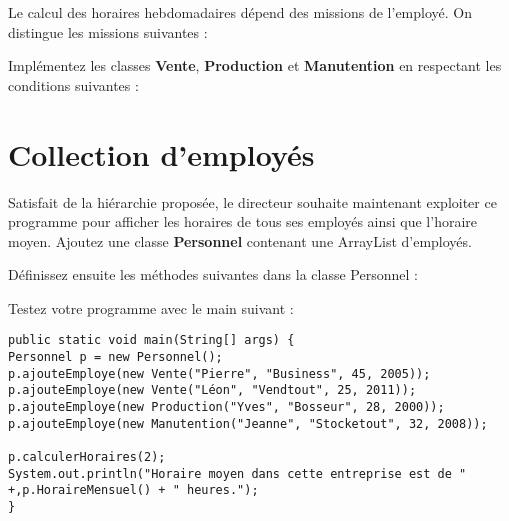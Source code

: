 \documentclass[a4paper]{article}
\begin{document}
Le calcul des horaires hebdomadaires dépend des missions de l’employé.
On distingue les missions suivantes :


Implémentez les classes \textbf{Vente},
	\textbf{Production} et \textbf{Manutention} en respectant les conditions suivantes :


\section{Collection d’employés}

Satisfait de la hiérarchie proposée,
	le directeur souhaite maintenant exploiter ce programme pour afficher les horaires de tous ses employés ainsi que l’horaire moyen.
Ajoutez une classe \textbf{Personnel} contenant une ArrayList d’employés.

\medskip
Définissez ensuite les méthodes suivantes dans la classe Personnel :

Testez votre programme avec le main suivant :

\begin{lstlisting}
public static void main(String[] args) {
Personnel p = new Personnel();
p.ajouteEmploye(new Vente("Pierre", "Business", 45, 2005));
p.ajouteEmploye(new Vente("Léon", "Vendtout", 25, 2011));
p.ajouteEmploye(new Production("Yves", "Bosseur", 28, 2000));
p.ajouteEmploye(new Manutention("Jeanne", "Stocketout", 32, 2008));

p.calculerHoraires(2);
System.out.println("Horaire moyen dans cette entreprise est de " +,p.HoraireMensuel() + " heures.");
}
\end{lstlisting}
\end{document}
